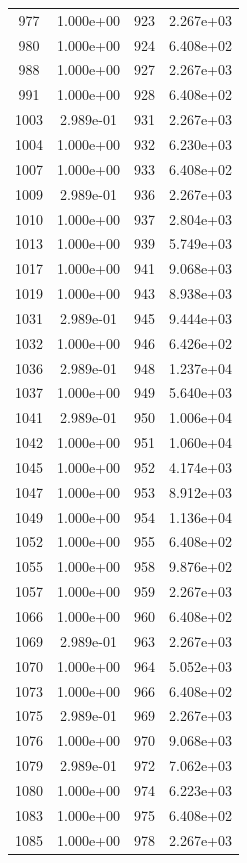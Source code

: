 \documentclass[12pt]{article}
\begin{document}
\begin{longtable}{@{}cccc@{}}
977 & 1.000e+00 & 923 & 2.267e+03 \\
980 & 1.000e+00 & 924 & 6.408e+02 \\
988 & 1.000e+00 & 927 & 2.267e+03 \\
991 & 1.000e+00 & 928 & 6.408e+02 \\
1003 & 2.989e-01 & 931 & 2.267e+03 \\
1004 & 1.000e+00 & 932 & 6.230e+03 \\
1007 & 1.000e+00 & 933 & 6.408e+02 \\
1009 & 2.989e-01 & 936 & 2.267e+03 \\
1010 & 1.000e+00 & 937 & 2.804e+03 \\
1013 & 1.000e+00 & 939 & 5.749e+03 \\
1017 & 1.000e+00 & 941 & 9.068e+03 \\
1019 & 1.000e+00 & 943 & 8.938e+03 \\
1031 & 2.989e-01 & 945 & 9.444e+03 \\
1032 & 1.000e+00 & 946 & 6.426e+02 \\
1036 & 2.989e-01 & 948 & 1.237e+04 \\
1037 & 1.000e+00 & 949 & 5.640e+03 \\
1041 & 2.989e-01 & 950 & 1.006e+04 \\
1042 & 1.000e+00 & 951 & 1.060e+04 \\
1045 & 1.000e+00 & 952 & 4.174e+03 \\
1047 & 1.000e+00 & 953 & 8.912e+03 \\
1049 & 1.000e+00 & 954 & 1.136e+04 \\
1052 & 1.000e+00 & 955 & 6.408e+02 \\
1055 & 1.000e+00 & 958 & 9.876e+02 \\
1057 & 1.000e+00 & 959 & 2.267e+03 \\
1066 & 1.000e+00 & 960 & 6.408e+02 \\
1069 & 2.989e-01 & 963 & 2.267e+03 \\
1070 & 1.000e+00 & 964 & 5.052e+03 \\
1073 & 1.000e+00 & 966 & 6.408e+02 \\
1075 & 2.989e-01 & 969 & 2.267e+03 \\
1076 & 1.000e+00 & 970 & 9.068e+03 \\
1079 & 2.989e-01 & 972 & 7.062e+03 \\
1080 & 1.000e+00 & 974 & 6.223e+03 \\
1083 & 1.000e+00 & 975 & 6.408e+02 \\
1085 & 1.000e+00 & 978 & 2.267e+03 \\

\end{longtable}
\end{document}
